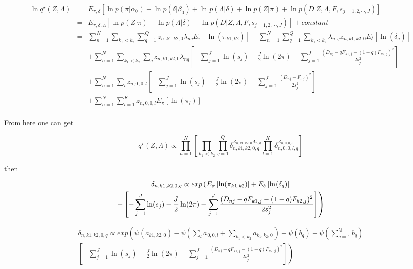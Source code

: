 \documentclass[12pt]{article}
\begin{document}
\begin{eqnarray}
\ln q^{\star} (Z, \Lambda)  & = & E_{\pi, \delta} \left [ \ln p(\pi|\alpha_0) + \ln p(\delta | \beta_0) + \ln p(\Lambda | \delta) + \ln p(Z | \pi) + \ln p(D | Z, \Lambda, F, s_{j=1,2,\cdots,J}) \right ] \\ \nonumber
  & = & E_{\pi, \delta, \Lambda} \left [ \ln p(Z | \pi) + \ln p(\Lambda | \delta) + \ln p(D | Z, \Lambda, F, s_{j=1,2,\cdots,J}) \right] + constant \\\nonumber
  & = & \sum_{n=1}^{N} \sum_{k_1 < k_2}\sum_{q=1}^{Q} z_{n, k1, k2, 0} \lambda_{nq} E_{\pi} \left [ \ln (\pi_{k1, k2}) \right ] + \sum_{n=1}^{N} \sum_{q=1}^{Q} \sum_{k_1 < k_2} \lambda_{n,q} z_{n, k1, k2, 0} E_{\delta} \left [ \ln (\delta_{q}) \right] \\ \nonumber
  &&  + \sum_{n=1}^{N} \sum_{k_1 < k_2}  \sum_{q} z_{n, k1, k2, 0} \lambda_{nq} \left [ - \sum_{j=1}^{J} \ln (s_j) - \frac{J}{2} \ln (2 \pi) - \sum_{j=1}^{J} \frac{(D_{nj} - qF_{k1,j} - (1-q)F_{k2,j})^2}{2s^2_j} \right] \\ \nonumber
  &&  +  \sum_{n=1}^{N} \sum_{l}  z_{n, 0, 0, l} \left [ - \sum_{j=1}^{J} \ln (s_j) - \frac{J}{2} \ln (2 \pi) - \sum_{j=1}^{J} \frac{(D_{nj} - F_{l,j} )^2}{2s^2_j} \right] \\ \nonumber 
  && +  \sum_{n=1}^{N} \sum_{l=1}^{K} z_{n, 0, 0, l} E_{\pi} \left [ \ln (\pi_{l}) \right ] \\ \nonumber
\end{eqnarray}

From here one can get 

$$ q^{\star}(Z, \Lambda) \propto \prod_{n=1}^{N} \left[\prod_{k_1 < k_2} \prod_{q=1}^{Q} \delta_{n, k1, k2, 0, q}^{Z_{n, k1, k2, 0} \Lambda_{n,q}} \prod_{l=1}^{K} \delta_{n, 0, 0, l, q}^{Z_{n, 0, 0, l}} \right]$$

then 

\begin{multline}
 $$ \delta_{n, k1, k2, 0, q} \propto exp \left (  E_{\pi} \left [ \ln (\pi_{k1,k2}) \right] +  E_{\delta} \left [ \ln (\delta_{q}) \right ] \right. \\
 \left . +  \left [ - \sum_{j=1}^{J} \ln (s_j)  - \frac{J}{2} \ln (2 \pi) - \sum_{j=1}^{J} \frac{(D_{nj} - qF_{k1,j} - (1-q)F_{k2,j})^2}{2s^2_j} \right] \right ) 
\end{multline}

\begin{multline}
  \delta_{n, k1, k2, 0, q} \propto exp \left ( \psi({a_{k1, k2, 0}}) - \psi(\sum_{l} a_{0, 0, l} + \sum_{k_1 < k_2} a_{k_1, k_2, 0})  +   \psi(b_{q}) - \psi(\sum_{q=1}^{Q} b_{q}) \right . \\
  \left . \left [ - \sum_{j=1}^{J} \ln (s_j)  - \frac{J}{2} \ln (2 \pi) -  \sum_{j=1}^{J} \frac{(D_{nj} - qF_{k1,j} - (1-q)F_{k2,j})^2}{2s^2_j} \right] \right ) 
\end{multline}
\end{document}
